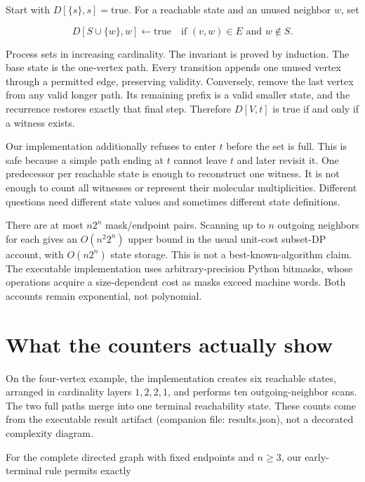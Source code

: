 Start with \(D[\{s\},s]=\mathrm{true}\). For a reachable state and an
unused neighbor \(w\), set

\begin{equation}
D[S\cup\{w\},w]\leftarrow\mathrm{true}
\quad\text{if }(v,w)\in E\text{ and }w\notin S.
\end{equation}

Process sets in increasing cardinality. The invariant is proved by
induction. The base state is the one-vertex path. Every transition
appends one unused vertex through a permitted edge, preserving validity.
Conversely, remove the last vertex from any valid longer path. Its
remaining prefix is a valid smaller state, and the recurrence restores
exactly that final step. Therefore \(D[V,t]\) is true if and only if a
witness exists.

Our implementation additionally refuses to enter \(t\) before the set is
full. This is safe because a simple path ending at \(t\) cannot leave
\(t\) and later revisit it. One predecessor per reachable state is
enough to reconstruct one witness. It is not enough to count all
witnesses or represent their molecular multiplicities. Different
questions need different state values and sometimes different state
definitions.

There are at most \(n2^n\) mask/endpoint pairs. Scanning up to \(n\)
outgoing neighbors for each gives an \(O(n^2 2^n)\) upper bound in the
usual unit-cost subset-DP account, with \(O(n2^n)\) state storage. This
is not a best-known-algorithm claim. The executable implementation uses
arbitrary-precision Python bitmasks, whose operations acquire a
size-dependent cost as masks exceed machine words. Both accounts remain
exponential, not polynomial.

\section{What the counters actually
show}\label{what-the-counters-actually-show}

On the four-vertex example, the implementation creates six reachable
states, arranged in cardinality layers \(1,2,2,1\), and performs ten
outgoing-neighbor scans. The two full paths merge into one terminal
reachability state. These counts come from the executable result
artifact (companion file: results.json), not a decorated complexity
diagram.

For the complete directed graph with fixed endpoints and \(n\ge3\), our
early-terminal rule permits exactly

